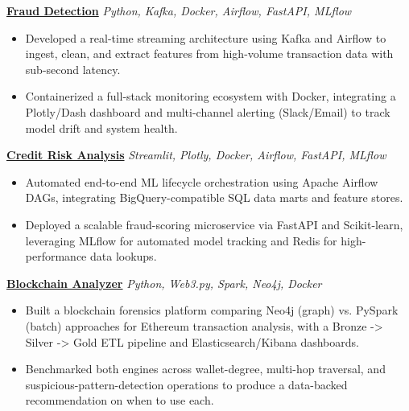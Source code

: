 \documentclass[10pt,letterpaper]{article}
\newcommand{\resumeItem}[1]{%
    \item\small{#1}
}
\newcommand{\resumeProjectHeading}[2]{%
    \vspace{2pt}
    \textbf{#1} \hfill \textit{\small #2}
    \vspace{1pt}
}
\newcommand{\resumeItemListStart}{\begin{itemize}}
\newcommand{\resumeItemListEnd}{\end{itemize}\vspace{2pt}}
\begin{document}
\resumeProjectHeading
    {\href{https://github.com/Eng-Zakaria/Fraud_Detection}{Fraud Detection}}
    {Python, Kafka, Docker, Airflow, FastAPI, MLflow}
\resumeItemListStart
    \resumeItem{Developed a real-time streaming architecture using Kafka and Airflow to ingest, clean, and extract features from high-volume transaction data with sub-second latency.}
    \resumeItem{Containerized a full-stack monitoring ecosystem with Docker, integrating a Plotly/Dash dashboard and multi-channel alerting (Slack/Email) to track model drift and system health.}
\resumeItemListEnd

\resumeProjectHeading
    {\href{https://github.com/Eng-Zakaria/Risk_Analysis}{Credit Risk Analysis}}
    {Streamlit, Plotly, Docker, Airflow, FastAPI, MLflow}
\resumeItemListStart
    \resumeItem{Automated end-to-end ML lifecycle orchestration using Apache Airflow DAGs, integrating BigQuery-compatible SQL data marts and feature stores.}
    \resumeItem{Deployed a scalable fraud-scoring microservice via FastAPI and Scikit-learn, leveraging MLflow for automated model tracking and Redis for high-performance data lookups.}
\resumeItemListEnd

\resumeProjectHeading
    {\href{https://github.com/Eng-Zakaria/blockchain-analyzer}{Blockchain Analyzer}}
    {Python, Web3.py, Spark, Neo4j, Docker}
\resumeItemListStart
    \resumeItem{Built a blockchain forensics platform comparing Neo4j (graph) vs. PySpark (batch) approaches for Ethereum transaction analysis, with a Bronze -> Silver -> Gold ETL pipeline and Elasticsearch/Kibana dashboards.}
    \resumeItem{Benchmarked both engines across wallet-degree, multi-hop traversal, and suspicious-pattern-detection operations to produce a data-backed recommendation on when to use each.}
\resumeItemListEnd
\end{document}
